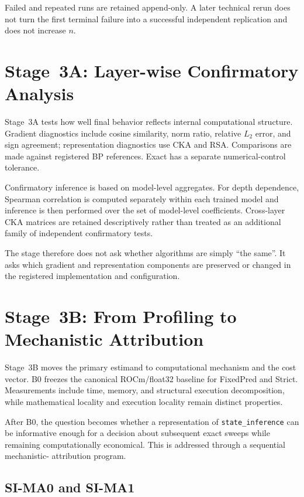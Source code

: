 Failed and repeated runs are retained append-only. A later technical rerun does not
turn the first terminal failure into a successful independent replication and does not
increase \(n\).

\section{Stage~3A: Layer-wise Confirmatory Analysis}
\label{sec:method-stage3a-en}

Stage~3A tests how well final behavior reflects internal computational structure.
Gradient diagnostics include cosine similarity, norm ratio, relative \(L_2\) error,
and sign agreement; representation diagnostics use CKA and RSA. Comparisons are made
against registered BP references. Exact has a separate numerical-control tolerance.

Confirmatory inference is based on model-level aggregates. For depth dependence,
Spearman correlation is computed separately within each trained model and inference
is then performed over the set of model-level coefficients. Cross-layer CKA matrices
are retained descriptively rather than treated as an additional family of independent
confirmatory tests.

The stage therefore does not ask whether algorithms are simply ``the same''. It asks
which gradient and representation components are preserved or changed in the
registered implementation and configuration.

\section{Stage~3B: From Profiling to Mechanistic Attribution}
\label{sec:method-stage3b-en}

Stage~3B moves the primary estimand to computational mechanism and the cost vector. B0
freezes the canonical ROCm/float32 baseline for FixedPred and Strict. Measurements
include time, memory, and structural execution decomposition, while mathematical
locality and execution locality remain distinct properties.

After B0, the question becomes whether a representation of \texttt{state\_inference}
can be informative enough for a decision about subsequent exact sweeps while remaining
computationally economical. This is addressed through a sequential mechanistic-
attribution program.

\subsection{SI-MA0 and SI-MA1}

